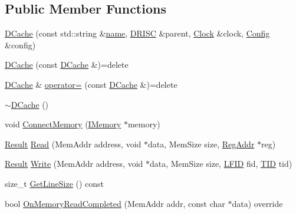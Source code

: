 \subsection*{Public Member Functions}
\begin{DoxyCompactItemize}
\item 
\hyperlink{class_simulator_1_1drisc_1_1_d_cache_a8edd4655eb4e5343f43fc681538e7bdb}{D\+Cache} (const std\+::string \&\hyperlink{mtconf_8c_a8f8f80d37794cde9472343e4487ba3eb}{name}, \hyperlink{class_simulator_1_1_d_r_i_s_c}{D\+R\+I\+S\+C} \&parent, \hyperlink{class_simulator_1_1_clock}{Clock} \&clock, \hyperlink{class_config}{Config} \&config)
\item 
\hyperlink{class_simulator_1_1drisc_1_1_d_cache_a06d937fa2b18e01cd656aa2da4aa7af3}{D\+Cache} (const \hyperlink{class_simulator_1_1drisc_1_1_d_cache}{D\+Cache} \&)=delete
\item 
\hyperlink{class_simulator_1_1drisc_1_1_d_cache}{D\+Cache} \& \hyperlink{class_simulator_1_1drisc_1_1_d_cache_aa1615320c6877f87cf3383d7a3aa217b}{operator=} (const \hyperlink{class_simulator_1_1drisc_1_1_d_cache}{D\+Cache} \&)=delete
\item 
\hyperlink{class_simulator_1_1drisc_1_1_d_cache_a6411ac3c301f537cd66740e4c8a68b1c}{$\sim$\+D\+Cache} ()
\item 
void \hyperlink{class_simulator_1_1drisc_1_1_d_cache_a28e1cd7e81331638001925605fa80cc8}{Connect\+Memory} (\hyperlink{class_simulator_1_1_i_memory}{I\+Memory} $\ast$memory)
\item 
\hyperlink{namespace_simulator_a4b6b5616e7236c0c131516a441776805}{Result} \hyperlink{class_simulator_1_1drisc_1_1_d_cache_aae572308d04dc67956b110a034c1824c}{Read} (Mem\+Addr address, void $\ast$data, Mem\+Size size, \hyperlink{struct_simulator_1_1_reg_addr}{Reg\+Addr} $\ast$reg)
\item 
\hyperlink{namespace_simulator_a4b6b5616e7236c0c131516a441776805}{Result} \hyperlink{class_simulator_1_1drisc_1_1_d_cache_ad7d0e5b2ca9a2099cc727db2a3ddaaf9}{Write} (Mem\+Addr address, void $\ast$data, Mem\+Size size, \hyperlink{namespace_simulator_aaccbc706b2d6c99085f52f6dfc2333e4}{L\+F\+I\+D} fid, \hyperlink{namespace_simulator_a483cc4ecee1736e895054617672cded5}{T\+I\+D} tid)
\item 
size\+\_\+t \hyperlink{class_simulator_1_1drisc_1_1_d_cache_a8007c040d65e09aac73021337b5d3323}{Get\+Line\+Size} () const 
\item 
bool \hyperlink{class_simulator_1_1drisc_1_1_d_cache_ae1cb74d2ac87cd7ffddd081c0da3ce15}{On\+Memory\+Read\+Completed} (Mem\+Addr addr, const char $\ast$data) override

\end{DoxyCompactItemize}

